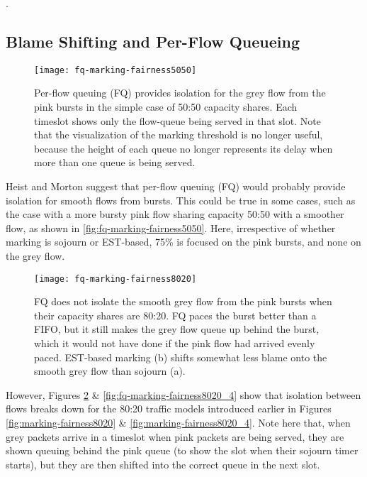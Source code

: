 .

\subsection{Blame Shifting and Per-Flow Queueing}\label{sec:fq_blame_shifting}

\begin{figure}[h]
	\centering
	\texttt{[image: fq-marking-fairness5050]}
	\caption{Per-flow queuing (FQ) provides isolation for the grey flow from the pink bursts in the simple case of 50:50 capacity shares. Each timeslot shows only the flow-queue being served in that slot. Note that the visualization of the marking threshold is no longer useful, because the height of each queue no longer represents its delay when more than one queue is being served.}\label{fig:fq-marking-fairness5050}
\end{figure}

Heist and Morton \cite{Heist20:L4S_tests} suggest that per-flow queuing (FQ) would probably provide isolation for smooth flows from bursts. This could be true in some cases, such as the case with a more bursty pink flow sharing capacity 50:50 with a smoother flow, as shown in \autoref{fig:fq-marking-fairness5050}. Here, irrespective of whether marking is sojourn or EST-based, 75\% is focused on the pink bursts, and none on the grey flow.

\begin{figure}[h]
	\centering
	\texttt{[image: fq-marking-fairness8020]}
	\caption{FQ does not isolate the smooth grey flow from the pink bursts when their capacity shares are 80:20. FQ paces the burst better than a FIFO, but it still makes the grey flow queue up behind the burst, which it would not have done if the pink flow had arrived evenly paced. EST-based marking (b) shifts somewhat less blame onto the smooth grey flow than sojourn (a).}\label{fig:fq-marking-fairness8020}
\end{figure}

However, Figures \ref{fig:fq-marking-fairness8020} \& \ref{fig:fq-marking-fairness8020_4} show that isolation between flows breaks down for the 80:20 traffic models introduced earlier in Figures \ref{fig:marking-fairness8020} \& \ref{fig:marking-fairness8020_4}. Note here that, when grey packets arrive in a timeslot when pink packets are being served, they are shown queuing behind the pink queue (to show the slot when their sojourn timer starts), but they are then shifted into the correct queue in the next slot.

